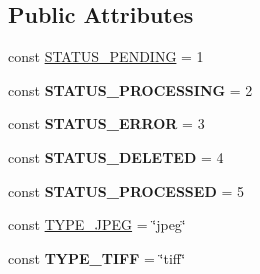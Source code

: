 \subsection*{Public Attributes}
\begin{DoxyCompactItemize}
\item 
const \hyperlink{classScan_a0a517a759400b21e5814247523d527de}{STATUS\_\-PENDING} = 1
\item 
\hypertarget{classScan_a059685b613793482fb87ca51bc0f0f60}{
const {\bfseries STATUS\_\-PROCESSING} = 2}
\label{classScan_a059685b613793482fb87ca51bc0f0f60}

\item 
\hypertarget{classScan_ab700b9c448f22eef759ab6eaed56e8ef}{
const {\bfseries STATUS\_\-ERROR} = 3}
\label{classScan_ab700b9c448f22eef759ab6eaed56e8ef}

\item 
\hypertarget{classScan_a508096fc915de5d0761c08be5bd7baef}{
const {\bfseries STATUS\_\-DELETED} = 4}
\label{classScan_a508096fc915de5d0761c08be5bd7baef}

\item 
\hypertarget{classScan_a1075afe3fb397fba5f84c2c8f2e5bb26}{
const {\bfseries STATUS\_\-PROCESSED} = 5}
\label{classScan_a1075afe3fb397fba5f84c2c8f2e5bb26}

\item 
const \hyperlink{classScan_a9837751227b9fa341e447d81e9f6057f}{TYPE\_\-JPEG} = \char`\"{}jpeg\char`\"{}
\item 
\hypertarget{classScan_a9ed06069bb19f356204285181db1b6e4}{
const {\bfseries TYPE\_\-TIFF} = \char`\"{}tiff\char`\"{}}
\label{classScan_a9ed06069bb19f356204285181db1b6e4}

\end{DoxyCompactItemize}
